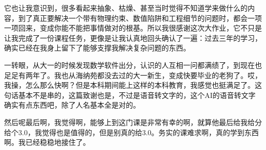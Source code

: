 它也让我意识到，很多看起来抽象、枯燥、甚至当时觉得不知道学来做什么的内容，到了真正要解决一个带有物理约束、数值陷阱和工程细节的问题时，都会一项一项回来，变成你能不能把事情做对的根基。所以我很感谢这次大作业，它不只是让我完成了一份课程任务，更像是让我认真地回头确认了一遍：过去三年的学习，确实已经在我身上留下了能够支撑我解决复杂问题的东西。

一转眼，从大一的时候发现数学软件出分，认识的人互相一问都满绩了，到现在也足足有两年了。我也从海纳苑都没去过的大一新生，变成快要毕业的老狗了。哎，我操，怎么那么快啊？但是本科期间能上这样的本科教育，我感觉也挺满足了。这句话基本不是串的，这篇致谢也是，不过是语音转文字的，这个AI的语音转文字确实有点东西吧，除了人名基本全是对的。

然后呢最后啊，我觉得啊，能够上到这门课是非常有幸的啊，就算他最后给我给分给个3.0，我觉得也是值得的，但是别真的给3.0。务实的课难求啊，真的学到东西啊。我已经稳稳地接住了。

